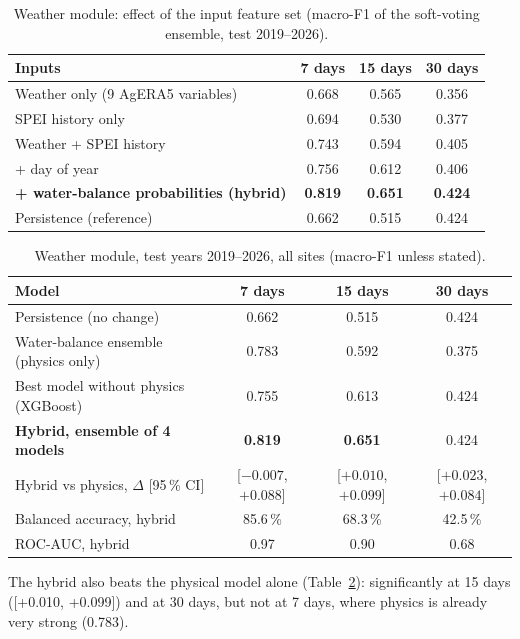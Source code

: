 \documentclass[11pt,a4paper,oneside]{article}
\newcommand{\mf}{macro-F1}
\begin{document}
\begin{table}[H]
\centering
\caption{Weather module: effect of the input feature set (\mf{} of the soft-voting ensemble, test 2019--2026).}
\label{tab:w_features}
\small
\begin{tabular}{@{}lccc@{}}
\toprule
\textbf{Inputs} & \textbf{7 days} & \textbf{15 days} & \textbf{30 days} \\
\midrule
Weather only (9 AgERA5 variables) & 0.668 & 0.565 & 0.356 \\
SPEI history only & 0.694 & 0.530 & 0.377 \\
Weather + SPEI history & 0.743 & 0.594 & 0.405 \\
+ day of year & 0.756 & 0.612 & 0.406 \\
\textbf{+ water-balance probabilities (hybrid)} & \textbf{0.819} & \textbf{0.651} & \textbf{0.424} \\
Persistence (reference) & 0.662 & 0.515 & 0.424 \\
\bottomrule
\end{tabular}
\end{table}


\begin{table}[H]
\centering
\caption{Weather module, test years 2019--2026, all sites (\mf{} unless stated).}
\label{tab:weather}
\small
\begin{tabular}{@{}lccc@{}}
\toprule
\textbf{Model} & \textbf{7 days} & \textbf{15 days} & \textbf{30 days} \\
\midrule
Persistence (no change) & 0.662 & 0.515 & 0.424 \\
Water-balance ensemble (physics only) & 0.783 & 0.592 & 0.375 \\
Best model without physics (XGBoost) & 0.755 & 0.613 & 0.424 \\
\textbf{Hybrid, ensemble of 4 models} & \textbf{0.819} & \textbf{0.651} & 0.424 \\
Hybrid vs physics, $\Delta$ [95\,\% CI] & [$-0.007$, $+0.088$] & [$+0.010$, $+0.099$] & [$+0.023$, $+0.084$] \\
Balanced accuracy, hybrid & 85.6\,\% & 68.3\,\% & 42.5\,\% \\
ROC-AUC, hybrid & 0.97 & 0.90 & 0.68 \\
\bottomrule
\end{tabular}
\end{table}

The hybrid also beats the physical model alone (Table~\ref{tab:weather}): significantly at 15 days ([+0.010, +0.099]) and at 30 days, but not at 7 days, where physics is already very strong (0.783).
\end{document}
